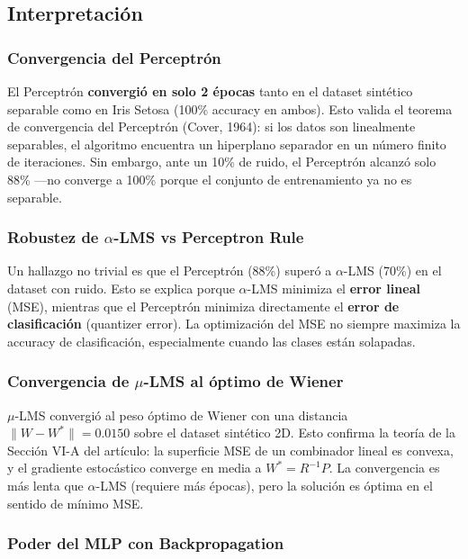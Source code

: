 \documentclass[12pt,a4paper]{article}
\newcommand{\norm}[1]{\lVert#1\rVert}
\begin{document}
\subsection{Interpretación}

\subsubsection{Convergencia del Perceptrón}

El Perceptrón \textbf{convergió en solo 2 épocas} tanto en el dataset sintético separable como en Iris Setosa (100\% accuracy en ambos). Esto valida el teorema de convergencia del Perceptrón (Cover, 1964): si los datos son linealmente separables, el algoritmo encuentra un hiperplano separador en un número finito de iteraciones. Sin embargo, ante un 10\% de ruido, el Perceptrón alcanzó solo 88\% —no converge a 100\% porque el conjunto de entrenamiento ya no es separable.

\subsubsection{Robustez de $\alpha$-LMS vs Perceptron Rule}

Un hallazgo no trivial es que el Perceptrón (88\%) superó a $\alpha$-LMS (70\%) en el dataset con ruido. Esto se explica porque $\alpha$-LMS minimiza el \textbf{error lineal} (MSE), mientras que el Perceptrón minimiza directamente el \textbf{error de clasificación} (quantizer error). La optimización del MSE no siempre maximiza la accuracy de clasificación, especialmente cuando las clases están solapadas.

\subsubsection{Convergencia de $\mu$-LMS al óptimo de Wiener}

$\mu$-LMS convergió al peso óptimo de Wiener con una distancia $\norm{W - W^*} = 0.0150$ sobre el dataset sintético 2D. Esto confirma la teoría de la Sección VI-A del artículo: la superficie MSE de un combinador lineal es convexa, y el gradiente estocástico converge en media a $W^* = R^{-1}P$. La convergencia es más lenta que $\alpha$-LMS (requiere más épocas), pero la solución es óptima en el sentido de mínimo MSE.

\subsubsection{Poder del MLP con Backpropagation}
\end{document}
